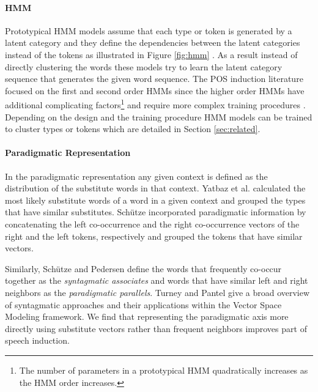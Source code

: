 \paragraph{HMM} Prototypical HMM models assume that each type or token is generated by
a latent category and they define the dependencies between the latent
categories instead of the tokens as illustrated in Figure
\ref{fig:hmm}
\cite{Brown:1992:CNG:176313.176316,blunsom-cohn:2011:ACL-HLT2011,goldwater-griffiths:2007:ACLMain,johnson:2007:EMNLP-CoNLL2007,Ganchev:2010:PRS:1859890.1859918,bergkirkpatrick-klein:2010:ACL,Lee:2010:STU:1870658.1870741}.
As a result instead of directly clustering the words these models try
to learn the latent category sequence that generates the given word
sequence.  The POS induction literature focused on the first and
second order HMMs since the higher order HMMs have additional
complicating factors\footnote{The number of parameters in a
  prototypical HMM quadratically increases as the HMM order
  increases.}  and require more complex training procedures
\cite{johnson:2007:EMNLP-CoNLL2007}.  Depending on the design and the
training procedure HMM models can be trained to cluster types or
tokens which are detailed in Section \ref{sec:related}.

\paragraph{Paradigmatic Representation} 

In the paradigmatic representation any given context is defined as the
distribution of the substitute words in that context.  Yatbaz et
al.  calculated the most
likely substitute words of a word in a given context and grouped the
types that have similar substitutes.  Sch\"{u}tze
 incorporated paradigmatic
information by concatenating the left co-occurrence and the right
co-occurrence vectors of the right and the left tokens, respectively
and grouped the tokens that have similar vectors.

Similarly, Sch{\"u}tze and Pedersen  define the
words that frequently co-occur together as the {\em syntagmatic
  associates} and words that have similar left and right neighbors as
the {\em paradigmatic parallels}.  Turney and Pantel
 give a broad overview of
syntagmatic approaches and their applications within the Vector Space
Modeling framework.  We find that representing the paradigmatic axis
more directly using substitute vectors rather than frequent neighbors
improves part of speech induction.

